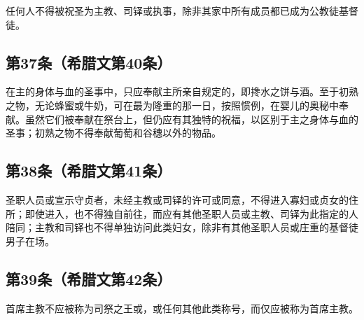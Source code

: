 任何人不得被祝圣为主教、司铎或执事，除非其家中所有成员都已成为公教徒基督徒。\par


\subsection{第37条（希腊文第40条）}

\par

在主的身体与血的圣事中，只应奉献主所亲自规定的，即搀水之饼与酒。至于初熟之物，无论蜂蜜或牛奶，可在最为隆重的那一日，按照惯例，在婴儿的奥秘中奉献。虽然它们被奉献在祭台上，但仍应有其独特的祝福，以区别于主之身体与血的圣事；初熟之物不得奉献葡萄和谷穗以外的物品。\par


\subsection{第38条（希腊文第41条）}

\par

圣职人员或宣示守贞者，未经主教或司铎的许可或同意，不得进入寡妇或贞女的住所；即使进入，也不得独自前往，而应有其他圣职人员或主教、司铎为此指定的人陪同；主教和司铎也不得单独访问此类妇女，除非有其他圣职人员或庄重的基督徒男子在场。\par


\subsection{第39条（希腊文第42条）}

\par

首席主教不应被称为司祭之王或，或任何其他此类称号，而仅应被称为首席主教。\par


